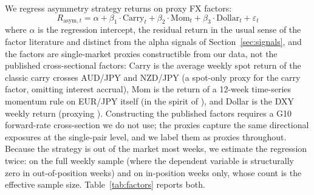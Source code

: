 \documentclass[11pt]{article}
\begin{document}
We regress asymmetry strategy returns on proxy FX factors:
\begin{equation}
    R_{\text{asym},t} = \alpha + \beta_1 \cdot \text{Carry}_t + \beta_2 \cdot \text{Mom}_t + \beta_3 \cdot \text{Dollar}_t + \varepsilon_t
\end{equation}
where $\alpha$ is the regression intercept, the residual return in the usual sense of the factor literature and distinct from the alpha signals of Section~\ref{sec:signals}, and the factors are single-market proxies constructible from our data, not the published cross-sectional factors: Carry is the average weekly spot return of the classic carry crosses AUD/JPY and NZD/JPY (a spot-only proxy for the \citealp{lustig2011common} carry factor, omitting interest accrual), Mom is the return of a 12-week time-series momentum rule on EUR/JPY itself (in the spirit of \citealp{menkhoff2012currency}), and Dollar is the DXY weekly return (proxying \citealp{verdelhan2018dollar}). Constructing the published factors requires a G10 forward-rate cross-section we do not use; the proxies capture the same directional exposures at the single-pair level, and we label them as proxies throughout. Because the strategy is out of the market most weeks, we estimate the regression twice: on the full weekly sample (where the dependent variable is structurally zero in out-of-position weeks) and on in-position weeks only, whose count is the effective sample size. Table~\ref{tab:factors} reports both.
\end{document}

